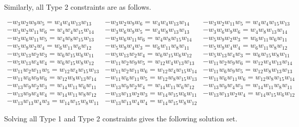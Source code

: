 \documentclass[12pt]{article}
\theoremstyle{plain}
\theoremstyle{definition}
\theoremstyle{remark}
\theoremstyle{definition}
\begin{document}
Similarly, all Type 2 constraints are as follows.

\begin{eqnarray*}
        -w_{3}w_{2}w_{9}w_{5} = w_{4}w_{4}w_{13}w_{13} & -w_{3}w_{2}w_{9}w_{6} = w_{4}w_{4}w_{13}w_{14} & -w_{3}w_{2}w_{11}w_{5} = w_{4}w_{4}w_{15}w_{13} \\
        -w_{3}w_{2}w_{11}w_{6} = w_{4}w_{4}w_{15}w_{14} & -w_{3}w_{6}w_{9}w_{5} = w_{4}w_{8}w_{13}w_{13} & -w_{3}w_{6}w_{9}w_{6} = w_{4}w_{8}w_{13}w_{14} \\
        -w_{3}w_{6}w_{11}w_{5} = w_{4}w_{8}w_{15}w_{13} & -w_{3}w_{6}w_{11}w_{6} = w_{4}w_{8}w_{15}w_{14} & -w_{5}w_{9}w_{2}w_{3} = w_{6}w_{11}w_{6}w_{11} \\
        -w_{5}w_{9}w_{2}w_{4} = w_{6}w_{11}w_{6}w_{12} & -w_{5}w_{9}w_{4}w_{3} = w_{6}w_{11}w_{8}w_{11} & -w_{5}w_{9}w_{4}w_{4} = w_{6}w_{11}w_{8}w_{12} \\
        -w_{5}w_{13}w_{2}w_{3} = w_{6}w_{15}w_{6}w_{11} & -w_{5}w_{13}w_{2}w_{4} = w_{6}w_{15}w_{6}w_{12} & -w_{5}w_{13}w_{4}w_{3} = w_{6}w_{15}w_{8}w_{11} \\
        -w_{5}w_{13}w_{4}w_{4} = w_{6}w_{15}w_{8}w_{12} & -w_{11}w_{2}w_{9}w_{5} = w_{12}w_{4}w_{13}w_{13} & -w_{11}w_{2}w_{9}w_{6} = w_{12}w_{4}w_{13}w_{14} \\
        -w_{11}w_{2}w_{11}w_{5} = w_{12}w_{4}w_{15}w_{13} & -w_{11}w_{2}w_{11}w_{6} = w_{12}w_{4}w_{15}w_{14} & -w_{11}w_{6}w_{9}w_{5} = w_{12}w_{8}w_{13}w_{13} \\
        -w_{11}w_{6}w_{9}w_{6} = w_{12}w_{8}w_{13}w_{14} & -w_{11}w_{6}w_{11}w_{5} = w_{12}w_{8}w_{15}w_{13} & -w_{11}w_{6}w_{11}w_{6} = w_{12}w_{8}w_{15}w_{14} \\
        -w_{13}w_{9}w_{2}w_{3} = w_{14}w_{11}w_{6}w_{11} & -w_{13}w_{9}w_{2}w_{4} = w_{14}w_{11}w_{6}w_{12} & -w_{13}w_{9}w_{4}w_{3} = w_{14}w_{11}w_{8}w_{11} \\
        -w_{13}w_{9}w_{4}w_{4} = w_{14}w_{11}w_{8}w_{12} & -w_{13}w_{13}w_{2}w_{3} = w_{14}w_{15}w_{6}w_{11} & -w_{13}w_{13}w_{2}w_{4} = w_{14}w_{15}w_{6}w_{12} \\
        -w_{13}w_{13}w_{4}w_{3} = w_{14}w_{15}w_{8}w_{11} & -w_{13}w_{13}w_{4}w_{4} = w_{14}w_{15}w_{8}w_{12} & 
\end{eqnarray*}

Solving all Type 1 and Type 2 constraints gives the following solution set.
\end{document}
